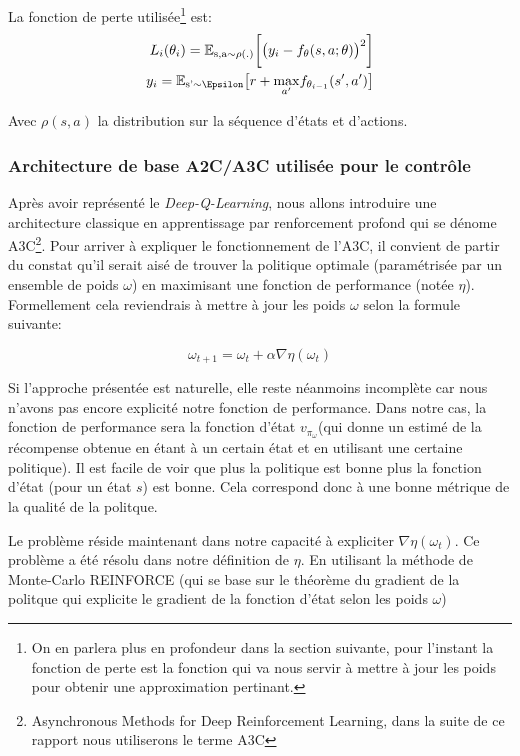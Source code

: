 La fonction de perte utilisée\footnote{On en parlera plus en profondeur dans la section suivante, pour l'instant la fonction de perte est la fonction qui va nous servir à mettre à jour les poids pour obtenir une approximation pertinant.} est: 
\begin{align}
L_i(\theta_i) = \mathbb{E_{\text{s}, \text{a} \sim \rho(.)}}\bigg[ \big( y_i - f_\theta(s, a; \theta)\big)^2 \bigg]\\
y_i = \mathbb{E}_{\text{s'} \sim \Epsilon}\big[r + \underset{a'}{\max}f_{\theta_{i-1}}(s', a') \big] 
\end{align}

Avec $\rho(s, a)$ la distribution sur la séquence d'états et d'actions.

\subsubsection{Architecture de base A2C/A3C utilisée pour le contrôle}
Après avoir représenté le \emph{Deep-Q-Learning}, nous allons introduire une architecture classique en apprentissage par renforcement profond qui se dénome \gls{A3C}\cite{DBLP:journals/corr/MnihBMGLHSK16}\footnote{Asynchronous Methods for Deep Reinforcement Learning, dans la suite de ce rapport nous utiliserons le terme \gls{A3C}}. 
Pour arriver à expliquer le fonctionnement de l'\gls{A3C}, il convient de partir du constat qu'il serait aisé de trouver la politique optimale (paramétrisée par un ensemble de poids $\omega$) en maximisant une fonction de performance (notée $\eta$). Formellement cela reviendrais à mettre à jour les poids $\omega$ selon la formule suivante:

\begin{equation}
    \omega_{t+1} = \omega_t + \alpha \nabla \eta(\omega_t)
\end{equation}

Si l'approche présentée  est naturelle, elle reste néanmoins incomplète car nous n'avons pas encore explicité notre fonction de performance. Dans notre cas, la fonction de performance sera la fonction d'état $v_{\pi_\omega}$(qui donne un estimé de la récompense obtenue en étant à un certain état et en utilisant une certaine politique). Il est facile de voir que plus la politique est bonne plus la fonction d'état (pour un état $s$) est bonne. Cela correspond donc à une bonne métrique de la qualité de la politque.


Le problème réside maintenant dans notre capacité à expliciter $\nabla\eta(\omega_t)$. Ce problème a été résolu dans notre définition de $\eta$. En utilisant la méthode de Monte-Carlo REINFORCE \cite{Williams1992} (qui se base sur le théorème du gradient de la politque \cite{policygradient} qui explicite le gradient de la fonction d'état selon les poids $\omega$) 

